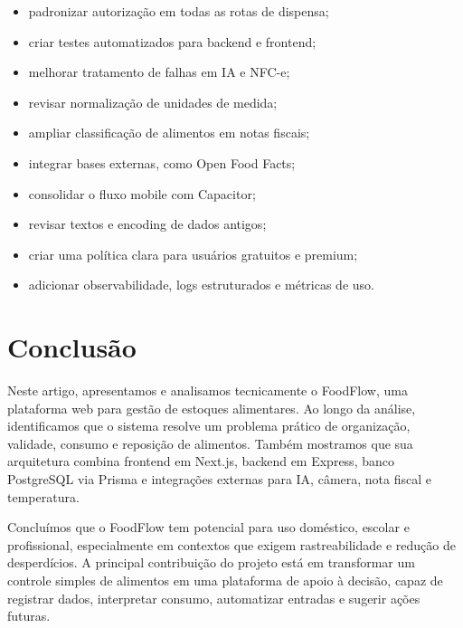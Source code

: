 \documentclass[12pt]{article}
\begin{document}
\begin{itemize}
    \item padronizar autorização em todas as rotas de dispensa;
    \item criar testes automatizados para backend e frontend;
    \item melhorar tratamento de falhas em IA e NFC-e;
    \item revisar normalização de unidades de medida;
    \item ampliar classificação de alimentos em notas fiscais;
    \item integrar bases externas, como Open Food Facts;
    \item consolidar o fluxo mobile com Capacitor;
    \item revisar textos e encoding de dados antigos;
    \item criar uma política clara para usuários gratuitos e premium;
    \item adicionar observabilidade, logs estruturados e métricas de uso.
\end{itemize}

\section{Conclusão}

Neste artigo, apresentamos e analisamos tecnicamente o FoodFlow, uma plataforma web para gestão de estoques alimentares. Ao longo da análise, identificamos que o sistema resolve um problema prático de organização, validade, consumo e reposição de alimentos. Também mostramos que sua arquitetura combina frontend em Next.js, backend em Express, banco PostgreSQL via Prisma e integrações externas para IA, câmera, nota fiscal e temperatura.

Concluímos que o FoodFlow tem potencial para uso doméstico, escolar e profissional, especialmente em contextos que exigem rastreabilidade e redução de desperdícios. A principal contribuição do projeto está em transformar um controle simples de alimentos em uma plataforma de apoio à decisão, capaz de registrar dados, interpretar consumo, automatizar entradas e sugerir ações futuras.
\end{document}
